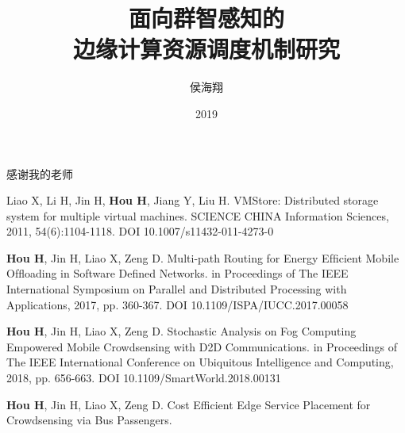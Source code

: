 \documentclass[format=draft,language=chinese,degree=phd,table,usenames,dvipsnames]{hustthesis}
\title{面向群智感知的\\边缘计算资源调度机制研究}{EN Title}
\author{侯海翔}{Haixiang Hou}
\date{2019}{5}{26}
\begin{document}
\frontmatter
\maketitle
\makeabstract
\tableofcontents
\mainmatter




% 










\begin{ack}
感谢我的老师

\end{ack}



\appendix


\begin{publications}
\item Liao X, Li H, Jin H, \textbf{Hou H}, Jiang Y, Liu H. VMStore: Distributed storage system for multiple virtual machines. SCIENCE CHINA Information Sciences, 2011, 54(6):1104-1118. DOI 10.1007/s11432-011-4273-0
\item \textbf{Hou H}, Jin H, Liao X, Zeng D. Multi-path Routing for Energy Efﬁcient Mobile Ofﬂoading in Software Deﬁned Networks. in Proceedings of The IEEE International Symposium on Parallel and Distributed Processing with Applications, 2017, pp. 360-367. DOI 10.1109/ISPA/IUCC.2017.00058
\item \textbf{Hou H}, Jin H, Liao X, Zeng D. Stochastic Analysis on Fog Computing Empowered Mobile Crowdsensing with D2D Communications. in Proceedings of The IEEE International Conference on Ubiquitous Intelligence and Computing, 2018, pp. 656-663. DOI 10.1109/SmartWorld.2018.00131
\item \textbf{Hou H}, Jin H, Liao X, Zeng D. Cost Efficient Edge Service Placement for Crowdsensing via Bus Passengers.
\end{publications}
\end{document}
